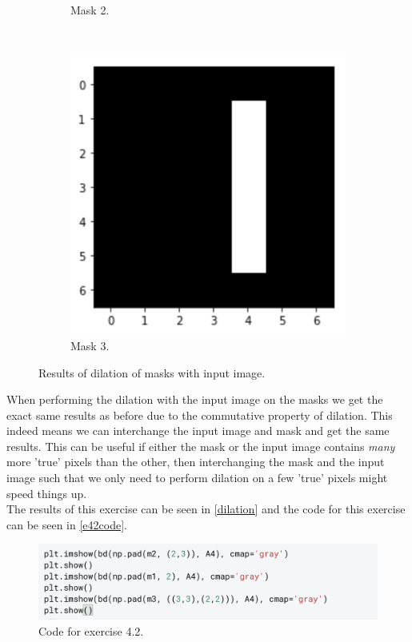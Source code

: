 \begin{figure}[H]
\begin{subfigure}[b]{0.45\textwidth}
		\caption{Mask 2.}
	\end{subfigure}
	\hfill
	\\
	\begin{subfigure}[b]{0.45\textwidth}
		\centering
		\includegraphics[width=\textwidth]{Materials/m3res}
		\caption{Mask 3.}
	\end{subfigure}
	\caption{Results of dilation of masks with input image.}
	\label{dilation}
\end{figure}
When performing the dilation with the input image on the masks we get the exact same results as before due to the commutative property of dilation. This indeed means we can interchange the input image and mask and get the same results. This can be useful if either the mask or the input image contains \textit{many} more 'true' pixels than the other, then interchanging the mask and the input image such that we only need to perform dilation on a few 'true' pixels might speed things up.\\
The results of this exercise can be seen in \autoref{dilation} and the code for this exercise can be seen in \autoref{e42code}.
\begin{figure}[H]
	\centering
	\includegraphics[width=0.7\linewidth]{Materials/e42code}
	\caption{Code for exercise 4.2.}
	\label{e42code}
\end{figure}
